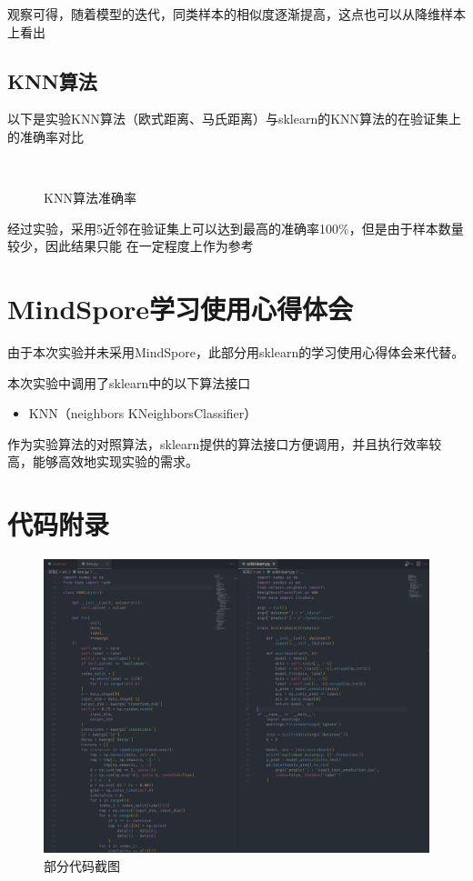 \documentclass[notitlepage]{article}
\begin{document}
观察可得，随着模型的迭代，同类样本的相似度逐渐提高，这点也可以从降维样本上看出

\subsection*{KNN算法}

以下是实验KNN算法（欧式距离、马氏距离）与sklearn的KNN算法的在验证集上的准确率对比

\begin{figure}[htbp]
	\centering
	\\
	\caption{KNN算法准确率}
\end{figure}

经过实验，采用5近邻在验证集上可以达到最高的准确率100\%，但是由于样本数量较少，因此结果只能
在一定程度上作为参考

\section{MindSpore学习使用心得体会}

由于本次实验并未采用MindSpore，此部分用sklearn的学习使用心得体会来代替。

本次实验中调用了sklearn中的以下算法接口

\begin{itemize}
    \item KNN（neighbors KNeighborsClassifier）
\end{itemize}

作为实验算法的对照算法，sklearn提供的算法接口方便调用，并且执行效率较高，能够高效地实现实验的需求。

\newpage

\section{代码附录}

\begin{figure}[h]
    \centering
    \includegraphics*[width=\columnwidth]{../imgs/code.png}
    \caption{部分代码截图}
\end{figure}
\end{document}
